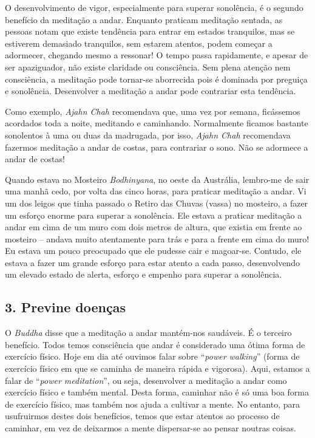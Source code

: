 O desenvolvimento de vigor, especialmente para superar sonolência, é o
segundo benefício da meditação a andar. Enquanto praticam meditação
sentada, as pessoas notam que existe tendência para entrar em estados
tranquilos, mas se estiverem demasiado tranquilos, sem estarem atentos,
podem começar a adormecer, chegando mesmo a ressonar! O tempo passa
rapidamente, e apesar de ser apaziguador, não existe claridade ou
consciência. Sem plena atenção nem consciência, a meditação pode
tornar-se aborrecida pois é dominada por preguiça e sonolência.
Desenvolver a meditação a andar pode contrariar esta tendência.

Como exemplo, \emph{Ajahn Chah} recomendava que, uma vez por semana,
ficássemos acordados toda a noite, meditando e caminhando. Normalmente
ficamos bastante sonolentos à uma ou duas da madrugada, por isso,
\emph{Ajahn Chah} recomendava fazermos meditação a andar de costas, para
contrariar o sono. Não se adormece a andar de costas!

Quando estava no Mosteiro \emph{Bodhinyana}, no oeste da Austrália,
lembro-me de sair uma manhã cedo, por volta das cinco horas, para
praticar meditação a andar. Vi um dos leigos que tinha passado o Retiro
das Chuvas (vassa) no mosteiro, a fazer um esforço enorme para superar a
sonolência. Ele estava a praticar meditação a andar em cima de um muro
com dois metros de altura, que existia em frente ao mosteiro -- andava
muito atentamente para trás e para a frente em cima do muro! Eu estava
um pouco preocupado que ele pudesse cair e magoar-se. Contudo, ele
estava a fazer um grande esforço para estar atento a cada passo,
desenvolvendo um elevado estado de alerta, esforço e empenho para
superar a sonolência.

\subsection{3. Previne doenças}

O \emph{Buddha} disse que a meditação a andar mantém-nos saudáveis. É o
terceiro benefício. Todos temos consciência que andar é considerado uma
ótima forma de exercício físico. Hoje em dia até ouvimos falar sobre
``\emph{power walking}'' (forma de exercício físico em que se caminha de
maneira rápida e vigorosa). Aqui, estamos a falar de ``\emph{power
meditation}'', ou seja, desenvolver a meditação a andar como exercício
físico e também mental. Desta forma, caminhar não é só uma boa forma de
exercício físico, mas também nos ajuda a cultivar a mente. No entanto,
para usufruirmos destes dois benefícios, temos que estar atentos ao
processo de caminhar, em vez de deixarmos a mente dispersar-se ao pensar
noutras coisas.

